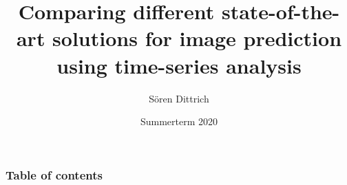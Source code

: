 \documentclass[12pt, a4paper]{beamer}
\title[Bachelorthesis Colloqium]{Comparing different state-of-the-art solutions for image prediction using time-series analysis}
\author{Sören Dittrich} %
\institute[] %
{
University of Hildesheim \\ %
}
\date{Summerterm 2020} %
\begin{document}
 \begin{frame}
 \titlepage %
 \end{frame}
 \begin{frame}
 \frametitle{Table of contents} %
 \tableofcontents %
 \end{frame}


 
 
 

 
 
 
 
% 
 
 
 
 
 
 
\end{document}
